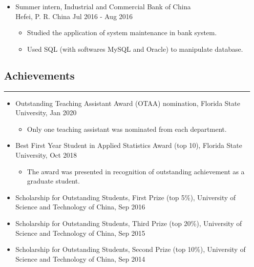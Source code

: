 \documentclass[10pt, oneside]{article}
\begin{document}
\begin{itemize}[itemsep=-1pt]
    \item Summer intern, Industrial and Commercial Bank of China\\
    Hefei, P. R. China \hfill Jul 2016 - Aug 2016
    \begin{itemize}[topsep=-2pt,itemsep=-1pt]
        \item Studied the application of system maintenance in bank system.
        \item Used SQL (with softwares MySQL and Oracle) to manipulate database.
    \end{itemize}
\end{itemize}

\subsection*{Achievements}
\noindent\rule{\textwidth}{1pt}
\begin{itemize}[itemsep=-1pt]
    \item Outstanding Teaching Assistant Award (OTAA) nomination, Florida State University, Jan 2020
    \begin{itemize}[topsep=-2pt,itemsep=-1pt]
        \item Only one teaching assistant was nominated from each department.
    \end{itemize}
    \item Best First Year Student in Applied Statistics Award (top 10), Florida State University, Oct 2018
    \begin{itemize}[topsep=-2pt,itemsep=-1pt]
        \item The award was presented in recognition of outstanding achievement as a graduate student.
    \end{itemize}
    \item Scholarship for Outstanding Students, First Prize (top 5\%), University of Science and Technology of China, Sep 2016
    \item Scholarship for Outstanding Students, Third Prize (top 20\%), University of Science and Technology of China, Sep 2015
    \item Scholarship for Outstanding Students, Second Prize (top 10\%), University of Science and Technology of China, Sep 2014
\end{itemize}
\end{document}
